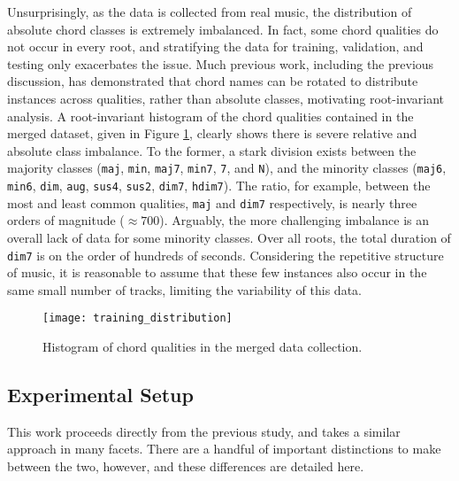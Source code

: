 Unsurprisingly, as the data is collected from real music, the distribution of absolute chord classes is extremely imbalanced.
In fact, some chord qualities do not occur in every root, and stratifying the data for training, validation, and testing only exacerbates the issue.
Much previous work, including the previous discussion, has demonstrated that chord names can be rotated to distribute instances across qualities, rather than absolute classes, motivating root-invariant analysis.
A root-invariant histogram of the chord qualities contained in the merged dataset, given in Figure \ref{fig:training_distribution}, clearly shows there is severe relative and absolute class imbalance.
To the former, a stark division exists between the majority classes (\texttt{maj}, \texttt{min}, \texttt{maj7}, \texttt{min7}, \texttt{7}, and \texttt{N}), and the minority classes (\texttt{maj6}, \texttt{min6}, \texttt{dim}, \texttt{aug}, \texttt{sus4}, \texttt{sus2}, \texttt{dim7}, \texttt{hdim7}).
The ratio, for example, between the most and least common qualities, \texttt{maj} and \texttt{dim7} respectively, is nearly three orders of magnitude ($\approx 700$).
Arguably, the more challenging imbalance is an overall lack of data for some minority classes.
Over all roots, the total duration of \texttt{dim7} is on the order of hundreds of seconds.
Considering the repetitive structure of music, it is reasonable to assume that these few instances also occur in the same small number of tracks, limiting the variability of this data.

\begin{figure}[!t]
\centering
\texttt{[image: training\_distribution]}
\caption{Histogram of chord qualities in the merged data collection.}
\label{fig:training_distribution}
\end{figure}


\subsection{Experimental Setup}
\label{subsec:experimental_setup}
This work proceeds directly from the previous study, and takes a similar approach in many facets.
There are a handful of important distinctions to make between the two, however, and these differences are detailed here.

